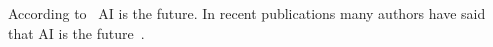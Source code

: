 \documentclass{article}
\begin{document}
  According to~\citet{Mindigulova_Vikhman_Romm_2023} AI is the future. In recent publications many authors have said that AI is the future~\citep{Mindigulova_Vikhman_Romm_2023,Velarde_2021}.

  
\end{document}
